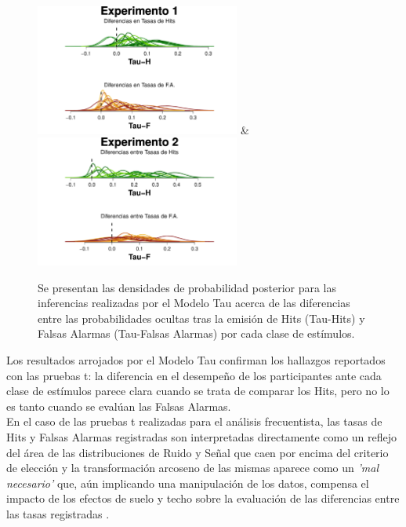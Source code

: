 \begin{figure}[th]
\centering
\includegraphics[width=0.6\textwidth]{Figures/MTau_DensidadTau_E1} \& \includegraphics[width=0.6\textwidth]{Figures/MTau_DensidadTau_E2}\\
\caption[Modelo Tau: Densidades de probabilidad posterior para los valores de los parámetros Tau; Experimentos 1 y 2]{Se presentan las densidades de probabilidad posterior para las inferencias realizadas por el Modelo Tau acerca de las diferencias entre las probabilidades ocultas tras la emisión de Hits (Tau-Hits) y Falsas Alarmas (Tau-Falsas Alarmas) por cada clase de estímulos.}
\label{fig:Tau}
\end{figure}

Los resultados arrojados por el Modelo Tau confirman los hallazgos reportados con las pruebas t: la diferencia en el desempeño de los participantes ante cada clase de estímulos parece clara cuando se trata de comparar los Hits, pero no lo es tanto cuando se evalúan las Falsas Alarmas.\\

En el caso de las pruebas t realizadas para el análisis frecuentista, las tasas de Hits y Falsas Alarmas registradas son interpretadas directamente como un reflejo del área de las distribuciones de Ruido y Señal que caen por encima del criterio de elección \parencite{Stainslaw1990} y la transformación arcoseno de las mismas aparece como un \textit{'mal necesario'} que, aún implicando una manipulación de los datos, compensa el impacto de los efectos de suelo y techo sobre la evaluación de las diferencias entre las tasas registradas \parencite{Glanzer1990}. \\ 

